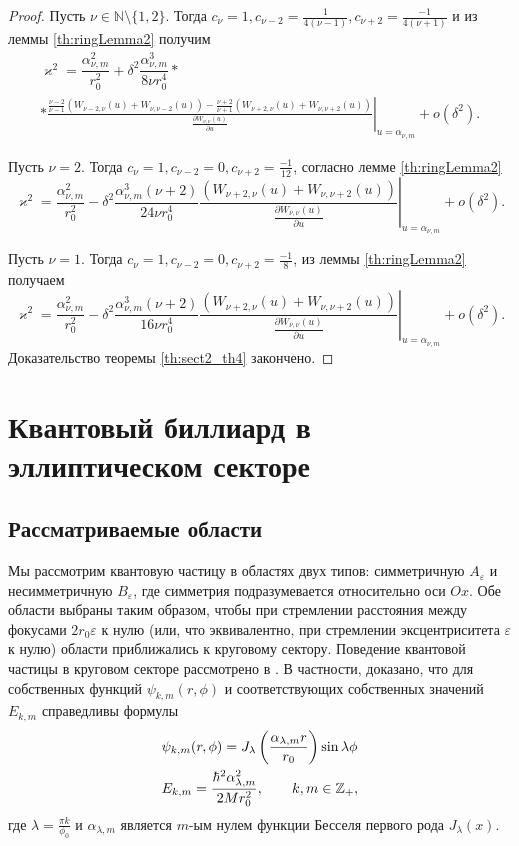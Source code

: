 \begin{proof}
Пусть $\nu \in \mathbb{N} \setminus \{1, 2\}$. Тогда $c_\nu=1,
	c_{\nu-2} = \frac{1}{4(\nu-1)}, c_{\nu+2} = \frac{-1}{4(\nu+1)}$ и из леммы \ref{th:ringLemma2}  получим
\begin{multline*}
\varkappa^2 = \dfrac{\alpha_{\nu, m}^2}{r_0^2} + \delta^2 \dfrac{\alpha_{\nu, m}^3}{8 \nu r_0^4} * \\
 * \left. \frac{
\frac{\nu-2}{\nu-1}
\left(
W_{\nu-2, \nu}(u) + W_{\nu, \nu-2}(u)
\right)- 
\frac{\nu+2}{\nu+1}
\left(
W_{\nu+2, \nu}(u) + W_{\nu, \nu+2}(u)
\right)
}{ \frac{\partial W_{\nu,\nu}(u)}{\partial u} }\right|_{u=\alpha_{\nu, m}} + o(\delta^2).
\end{multline*}


Пусть $\nu = 2$. Тогда $c_\nu = 1, c_{\nu-2} = 0, c_{\nu+2} = \frac{-1}{12} $, согласно лемме \ref{th:ringLemma2} 
$$\varkappa^2 = \dfrac{\alpha_{\nu, m}^2}{r_0^2} - \delta^2 \dfrac{\alpha_{\nu, m}^3(\nu+2)}{24 \nu  r_0^4} \left. \frac{
	\left(
	W_{\nu+2, \nu}(u) + W_{\nu, \nu+2}(u)
	\right)
}{ \frac{\partial W_{\nu,\nu}(u)}{\partial u} }\right|_{u=\alpha_{\nu, m}} + o(\delta^2).$$

Пусть $\nu = 1$. Тогда $c_\nu = 1, c_{\nu-2} = 0, c_{\nu+2} = \frac{-1}{8}$, из леммы \ref{th:ringLemma2}  получаем
$$\varkappa^2 = \dfrac{\alpha_{\nu, m}^2}{r_0^2} - \delta^2 \dfrac{\alpha_{\nu, m}^3 (\nu+2)}{16 \nu r_0^4}
\left. \frac{
	\left(
	W_{\nu+2, \nu}(u) + W_{\nu, \nu+2}(u)
	\right)
}{ \frac{\partial W_{\nu,\nu}(u)}{\partial u} }\right|_{u=\alpha_{\nu, m}} + o(\delta^2).$$
Доказательство теоремы \ref{th:sect2_th4} закончено.
\end{proof}

\section{Квантовый биллиард в эллиптическом секторе}\label{sec:ch2/sec2}
\subsection{Рассматриваемые области}\label{sec:ch2/sec2/sub1}

Мы рассмотрим квантовую частицу в областях двух типов: симметричную $A_\varepsilon$ и несимметричную $B_\varepsilon$, где симметрия подразумевается относительно оси $Ox$.
Обе области выбраны таким образом, чтобы при стремлении расстояния между фокусами $2r_0 \varepsilon $ к нулю (или, что эквивалентно, при стремлении эксцентриситета $\varepsilon$ к нулю) области приближались к круговому сектору.
Поведение квантовой частицы в круговом секторе рассмотрено в \cite{wref13}.
В частности, доказано, что для собственных функций $\psi_{k,m}(r,\phi)$ и соответствующих собственных значений $E_{k,m}$ справедливы формулы
\begin{align}
&\psi_{k, m}(r, \phi) = J_\lambda\left(\frac{\alpha_{\lambda, m}r}{r_0}\right)\sin{\lambda\phi}\notag \\  
&E_{k,m} = \frac{\hbar^2 \alpha_{\lambda, m}^2}{2M r_0^2},
 \qquad k, m \in \mathbb{Z}_+, \label{eq:energy0}
\end{align}
где 
$\lambda = \frac{\pi k}{\phi_0}$ и $\alpha_{\lambda, m}$ является
$m$-ым нулем функции Бесселя первого рода $J_\lambda(x)$.

